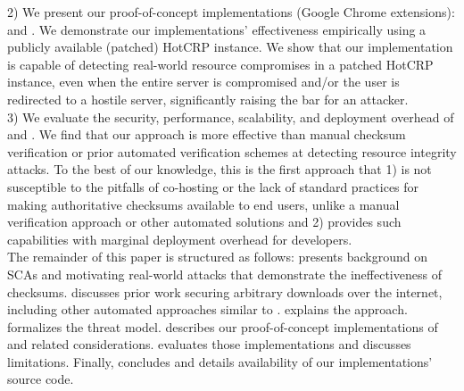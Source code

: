2) We present our proof-of-concept \SYSTEM{} implementations (Google Chrome
extensions): \DNSSYS{} and \DHTSYS{}. We demonstrate our implementations'
effectiveness empirically using a publicly available (patched) HotCRP instance.
We show that our \DNSSYS{} implementation is capable of detecting real-world
resource compromises in a patched HotCRP instance, even when the entire server
is compromised and/or the user is redirected to a hostile server, significantly
raising the bar for an attacker. \\

3) We evaluate the security, performance, scalability, and deployment overhead
of \DNSSYS{} and \DHTSYS{}. We find that our approach is more effective than
manual checksum verification or prior automated verification schemes at
detecting resource integrity attacks. To the best of our knowledge, this is the
first approach that 1) is not susceptible to the pitfalls of co-hosting or the
lack of standard practices for making authoritative checksums available to end
users, unlike a manual verification approach or other automated solutions and 2)
provides such capabilities with marginal deployment overhead for developers. \\

The remainder of this paper is structured as follows: 
presents background on SCAs and motivating real-world attacks that demonstrate
the ineffectiveness of checksums.  discusses prior work securing
arbitrary downloads over the internet, including other automated approaches
similar to \SYSTEM{}.  explains the \SYSTEM{} approach.
 formalizes the threat model.  describes
our proof-of-concept implementations of \SYSTEM{} and related considerations.
 evaluates those implementations and discusses limitations.
Finally,  concludes and  details
availability of our implementations' source code.
